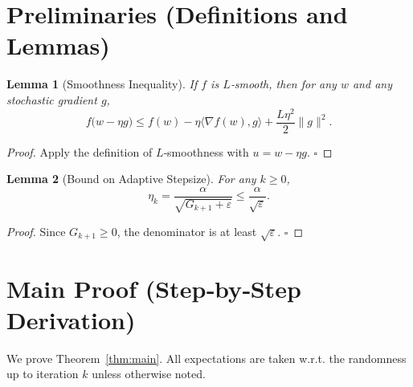 \documentclass{article}
\newtheorem{lemma}{Lemma}
\begin{document}
\newpage
\section*{Preliminaries (Definitions and Lemmas)}
\begin{lemma}[Smoothness Inequality]\label{lem:smooth}
If $f$ is $L$‑smooth, then for any $w$ and any stochastic gradient $g$,
\[
f\bigl(w-\eta g\bigr)
\le f(w)-\eta\langle\nabla f(w),g\rangle+\frac{L\eta^{2}}{2}\|g\|^{2}.
\]
\end{lemma}
\begin{proof}
Apply the definition of $L$‑smoothness with $u=w-\eta g$. \hfill $\square$
\end{proof}

\begin{lemma}[Bound on Adaptive Stepsize]\label{lem:stepsize}
For any $k\ge0$,
\[
\eta_k = \frac{\alpha}{\sqrt{G_{k+1}+\varepsilon}}
\le \frac{\alpha}{\sqrt{\varepsilon}}.
\]
\end{lemma}
\begin{proof}
Since $G_{k+1}\ge0$, the denominator is at least $\sqrt{\varepsilon}$. \hfill $\square$
\end{proof}

\section*{Main Proof (Step‑by‑Step Derivation)}
We prove Theorem~\ref{thm:main}. All expectations are taken w.r.t. the randomness up to iteration $k$ unless otherwise noted.
\end{document}
